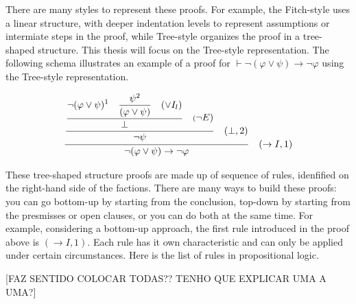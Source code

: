 There are many styles to represent these proofs. For example, the Fitch-style uses a linear structure, with deeper indentation levels to represent assumptions or intermiate steps in the proof, while Tree-style organizes the proof in a tree-shaped structure. This thesis will focus on the Tree-style representation. The following schema illustrates an example of a proof for \( \vdash \neg (\varphi \lor \psi) \to \neg \varphi \) using the Tree-style representation.

\[
\frac{\frac{\frac{
\displaystyle \neg (\varphi \lor \psi)^1 \quad \displaystyle \frac{\psi^2}{(\varphi \lor \psi) \strut} \quad (\lor I_l) }
{\displaystyle \bot \strut} \quad (\displaystyle \neg E)} {\displaystyle \neg \psi \strut} \quad (\bot, 2) }
{\neg (\varphi \lor \psi) \to \neg \varphi \strut} \quad (\to I, 1)
\]

These tree-shaped structure proofs are made up of sequence of rules, idenfified on the right-hand side of the factions. There are many ways to build these proofs: you can go bottom-up by starting from the conclusion, top-down by starting from the presmisses or open clauses, or you can do both at the same time. For example, considering a bottom-up approach, the first rule introduced in the proof above is \((\to I, 1)\). Each rule has it own characteristic and can only be applied under certain circumstances. Here is the list of rules in propositional logic.

[FAZ SENTIDO COLOCAR TODAS?? TENHO QUE EXPLICAR UMA A UMA?]


